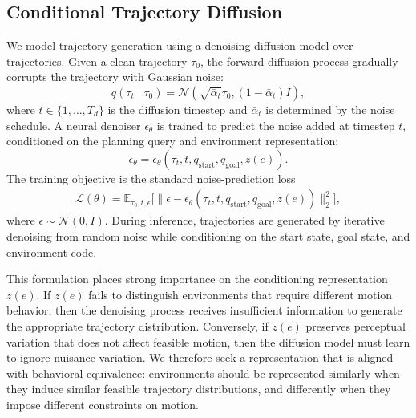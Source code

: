 \subsection{Conditional Trajectory Diffusion}

We model trajectory generation using a denoising diffusion model over trajectories. Given a clean trajectory $\tau_0$, the forward diffusion process gradually corrupts the trajectory with Gaussian noise:
%
\begin{equation}
    q(\tau_t \mid \tau_0)
    =
    \mathcal{N}
    \left(
        \sqrt{\bar{\alpha}_t}\tau_0,
        (1-\bar{\alpha}_t)I
    \right),
\end{equation}
%
where $t\in\{1,\ldots,T_d\}$ is the diffusion timestep and $\bar{\alpha}_t$ is determined by the noise schedule. A neural denoiser $\epsilon_\theta$ is trained to predict the noise added at timestep $t$, conditioned on the planning query and environment representation:
%
\begin{equation}
    \epsilon_\theta
    =
    \epsilon_\theta(
        \tau_t,
        t,
        q_{\mathrm{start}},
        q_{\mathrm{goal}},
        z(e)
    ).
\end{equation}
%
The training objective is the standard noise-prediction loss
%
\begin{equation}
\begin{split}
    \mathcal{L}(\theta)
    =
    \mathbb{E}_{\tau_0,t,\epsilon}
    \big[
    \big\|
        \epsilon -
        \epsilon_\theta(
            \tau_t,
            t,
            q_{\mathrm{start}},
            q_{\mathrm{goal}},
            z(e)
        )
    \big\|_2^2
    \big],
\end{split}
\end{equation}
%
where $\epsilon\sim\mathcal{N}(0,I)$. During inference, trajectories are generated by iterative denoising from random noise while conditioning on the start state, goal state, and environment code.

This formulation places strong importance on the conditioning representation $z(e)$. If $z(e)$ fails to distinguish environments that require different motion behavior, then the denoising process receives insufficient information to generate the appropriate trajectory distribution. Conversely, if $z(e)$ preserves perceptual variation that does not affect feasible motion, then the diffusion model must learn to ignore nuisance variation. We therefore seek a representation that is aligned with behavioral equivalence: environments should be represented similarly when they induce similar feasible trajectory distributions, and differently when they impose different constraints on motion.

